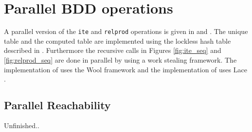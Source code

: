 \section{Parallel BDD operations}
A parallel version of the \texttt{ite} and \texttt{relprod} operations is given in \cite{dijk2012parallelization} and \cite{sylvan_multicore_bdd}. The unique table and the computed table are implemented using the lockless hash table described in \cite{so73119}. Furthermore the recursive calls in Figures \ref{fig:ite_seq} and \ref{fig:relprod_seq} are done in parallel by using a work stealing framework. The implementation of \cite{dijk2012parallelization} uses the Wool framework \cite{faxen2010efficient} and the implementation of \cite{sylvan_multicore_bdd} uses Lace \cite{dijk2013lace}. 

\subsection{Parallel Reachability}
Unfinished..